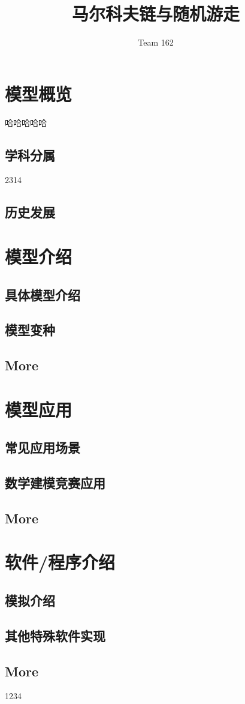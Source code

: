 \documentclass{ctexart}
\title{\textbf{马尔科夫链与随机游走}}
\author{Team 162}
\begin{document}
\maketitle
\tableofcontents
\section{模型概览}
哈哈哈哈哈
\subsection{学科分属}
2314
\subsection{历史发展}

\section{模型介绍}

\subsection{具体模型介绍}

\subsection{模型变种}

\subsection{More}


\section{模型应用}

\subsection{常见应用场景}


\subsection{数学建模竞赛应用}

\subsection{More}



\section{软件/程序介绍}

\subsection{模拟介绍}

\subsection{其他特殊软件实现}

\subsection{More}



\begin{appendices}
1234
\end{appendices}
\end{document}
